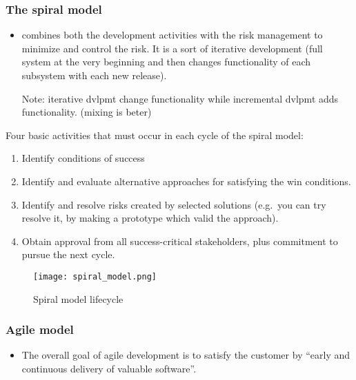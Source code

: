 \subsubsection{The spiral model}

\begin{itemize}
    \item combines both the development activities with the risk management to minimize and
        control the risk. 
    \proitem{} It is a sort of iterative development (full system at the very
        beginning and then changes functionality of each subsystem with each new
        release).

        Note: iterative dvlpmt change functionality while incremental dvlpmt
        adds functionality. (mixing is beter)
\end{itemize}

Four basic activities that must occur in each cycle of the spiral model:
\begin{enumerate}
    \item Identify conditions of success
    \item Identify and evaluate alternative approaches for satisfying the win
    conditions.
    \item Identify and resolve risks created by selected solutions
    (e.g.\ you can try resolve it, by making a prototype which valid the
    approach).
    \item Obtain approval from all success-critical stakeholders, plus
    commitment to pursue the next cycle.
\end{enumerate}

\begin{figure}[!ht]
    \centering
    \texttt{[image: spiral\_model.png]}
    \caption{Spiral model lifecycle}
\end{figure}
\FloatBarrier{}

\subsubsection{Agile model}

\begin{itemize}
    \proitem{} Flexible process (opposite to rigorous process with
conception/documentation/dev/tests) that adapt to changing requirements.
    \item The overall goal of agile development is
to satisfy the customer by \enquote{early and continuous delivery of
valuable software}.
\end{itemize}

